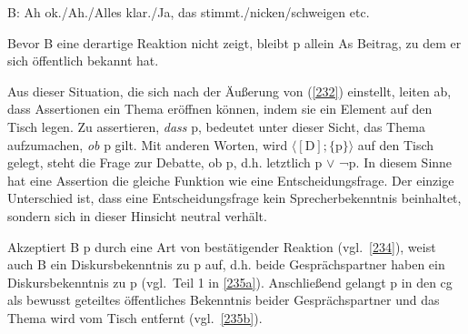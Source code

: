 \begin{exe}
	\ex\label{234}
	B: Ah ok./Ah./Alles klar./Ja, das stimmt./nicken/schweigen etc.
\end{exe}
Bevor B eine derartige Reaktion nicht zeigt, bleibt p allein As Beitrag, zu dem er sich öffentlich bekannt hat.

Aus dieser Situation, die sich nach der Äußerung von (\ref{232}) einstellt, leiten \citet{Farkas2010} ab, dass Assertionen ein Thema eröffnen können, indem sie ein Element auf den Tisch legen. Zu  assertieren, \emph{dass} p, bedeutet unter dieser Sicht, das Thema aufzumachen, \emph{ob} p gilt. Mit anderen Worten, wird $\langle[\textrm{D}]; \lbrace \textrm{p}\rbrace \rangle$ auf den Tisch gelegt, steht die Frage zur Debatte, ob p, d.h. letztlich p $\vee$ ¬p. In diesem Sinne hat eine Assertion die gleiche Funktion wie eine  Entscheidungsfrage. Der einzige Unterschied ist, dass eine Entscheidungsfrage kein Sprecherbekenntnis beinhaltet, sondern sich in dieser Hinsicht neutral verhält.

Akzeptiert B p durch eine Art von bestätigender Reaktion (vgl.\ \ref{234}), weist auch B ein Diskursbekenntnis zu p auf, d.h. beide Gesprächspartner haben ein Diskursbekenntnis zu p (vgl.\ Teil 1 in \ref{235a}). Anschließend gelangt p in den cg als bewusst geteiltes öffentliches Bekenntnis beider Gesprächspartner und das Thema wird vom Tisch entfernt (vgl.\ \ref{235b}).


